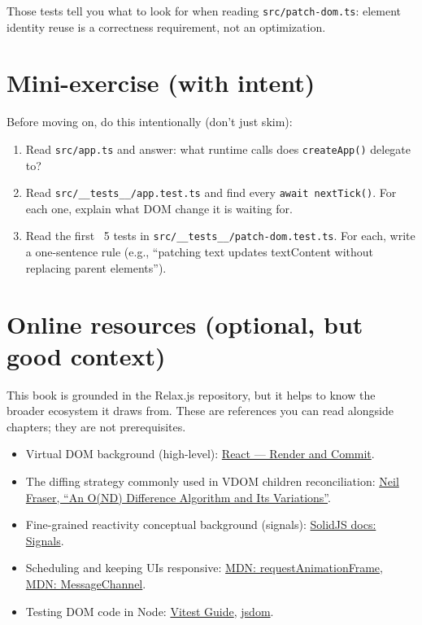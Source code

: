 Those tests tell you what to look for when reading \texttt{src/patch-dom.ts}: element identity reuse is a correctness requirement, not an optimization.

\section{Mini-exercise (with intent)}
Before moving on, do this intentionally (don't just skim):

\begin{enumerate}
  \item Read \texttt{src/app.ts} and answer: what runtime calls does \texttt{createApp()} delegate to?
  \item Read \texttt{src/\_\_tests\_\_/app.test.ts} and find every \texttt{await nextTick()}.
    For each one, explain what DOM change it is waiting for.
  \item Read the first ~5 tests in \texttt{src/\_\_tests\_\_/patch-dom.test.ts}.
    For each, write a one-sentence rule (e.g., ``patching text updates textContent without replacing parent elements'').
\end{enumerate}

\section{Online resources (optional, but good context)}
This book is grounded in the Relax.js repository, but it helps to know the broader ecosystem it draws from.
These are references you can read alongside chapters; they are not prerequisites.

\begin{itemize}
  \item Virtual DOM background (high-level):
  \href{https://react.dev/learn/render-and-commit}{React --- Render and Commit}.
  \item The diffing strategy commonly used in VDOM children reconciliation:
    \href{https://neil.fraser.name/writing/diff/}{Neil Fraser, ``An O(ND) Difference Algorithm and Its Variations''}.
  \item Fine-grained reactivity conceptual background (signals):
    \href{https://www.solidjs.com/docs/latest#signals}{SolidJS docs: Signals}.
  \item Scheduling and keeping UIs responsive:
    \href{https://developer.mozilla.org/en-US/docs/Web/API/window/requestAnimationFrame}{MDN: requestAnimationFrame},
    \href{https://developer.mozilla.org/en-US/docs/Web/API/MessageChannel}{MDN: MessageChannel}.
  \item Testing DOM code in Node:
    \href{https://vitest.dev/guide/}{Vitest Guide},
    \href{https://github.com/jsdom/jsdom}{jsdom}. 
\end{itemize}
